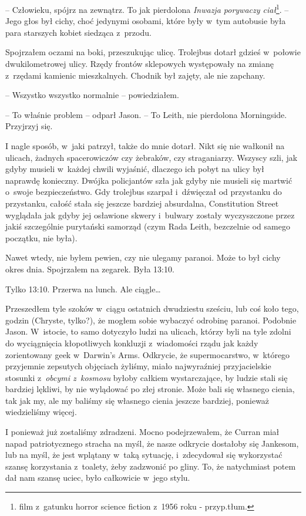 \documentclass[oneside,polish,12pt,sfheadings]{mwbk}
\begin{document}
-- Człowieku, spójrz na zewnątrz. To jak pierdolona \emph{Inwazja
porywaczy ciał}\footnote{film z~gatunku horror science
fiction z~1956 roku - przyp.tłum.}. -- Jego głos był cichy, choć
jedynymi osobami, które były w~tym autobusie była para starszych kobiet
siedząca z~przodu.

Spojrzałem oczami na boki, przeszukując ulicę. Trolejbus dotarł gdzieś w~połowie dwukilometrowej ulicy. Rzędy frontów sklepowych występowały na
zmianę z~rzędami kamienic mieszkalnych. Chodnik był zajęty, ale nie
zapchany.

-- Wszystko wszystko normalnie -- powiedziałem.

-- To właśnie problem -- odparł Jason. -- To Leith, nie pierdolona
Morningside. Przyjrzyj się.

I nagle sposób, w~jaki patrzył, także do mnie dotarł. Nikt się nie
wałkonił na ulicach, żadnych spacerowiczów czy żebraków, czy
straganiarzy. Wszyscy szli, jak gdyby musieli w~każdej chwili wyjaśnić,
dlaczego ich pobyt na ulicy był naprawdę konieczny. Dwójka policjantów
szła jak gdyby nie musieli się martwić o~swoje bezpieczeństwo. Gdy
trolejbus szarpał i~dźwięczał od przystanku do przystanku, całość stała
się jeszcze bardziej absurdalna, Constitution Street wyglądała jak gdyby
jej osławione skwery i~bulwary zostały wyczyszczone przez jakiś
szczególnie purytański samorząd (czym Rada Leith, bezczelnie od samego
początku, nie była).

Nawet wtedy, nie byłem pewien, czy nie ulegamy paranoi. Może to był
cichy okres dnia. Spojrzałem na zegarek. Była 13:10.

Tylko 13:10. Przerwa na lunch. Ale ciągle\ldots

Przeszedłem tyle szoków w~ciągu ostatnich dwudziestu sześciu, lub coś
koło tego, godzin (Chryste, tylko?), że mogłem sobie wybaczyć
odrobinę paranoi. Podobnie Jason. W~istocie, to samo dotyczyło ludzi na
ulicach, którzy byli na tyle zdolni do wyciągnięcia kłopotliwych
konkluzji z~wiadomości rządu jak każdy zorientowany geek w~Darwin's
Arms. Odkrycie, że supermocarstwo, w~którego przyjemnie zepsutych
objęciach żyliśmy, miało najwyraźniej przyjacielskie stosunki z~\emph{obcymi z~kosmosu} byłoby całkiem wystarczające, by ludzie stali
się bardziej lękliwi, by nie wylądować po złej stronie. Może bali się
własnego cienia, tak jak my, ale my baliśmy się własnego cienia jeszcze
bardziej, ponieważ wiedzieliśmy więcej.

I ponieważ już zostaliśmy zdradzeni. Mocno podejrzewałem, że Curran miał
napad patriotycznego stracha na myśl, że nasze odkrycie dostałoby się
Jankesom, lub na myśl, że jest wplątany w~taką sytuację, i~zdecydował
się wykorzystać szansę korzystania z~toalety, żeby zadzwonić po gliny.
To, że natychmiast potem dał nam szansę uciec, było całkowicie w~jego
stylu.
\end{document}
